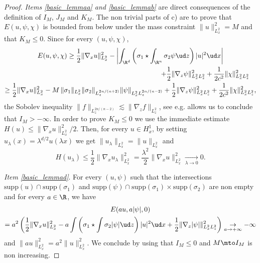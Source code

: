 \begin{proof}
\textit{Items \eqref{basic_lemmaa} and \eqref{basic_lemmab}} are direct consequences of the definition of $I_{M}$, $J_{M}$ and $K_{M}$. The non trivial parts of c) are to prove that $E(u,\psi,\chi)$ is bounded from below under the mass constraint $\|u\|_{L_{x}^{2}}^{2}=M$ and that $K_{M}\leq 0$. Since for every $(u,\psi,\chi)$,\vspace*{-5pt}
\bgroup
{}
\begin{multline}\label{gradient_borne}
E(u,\psi,\chi)\geq\frac{1}{2}\|\nabla_{x}u\|_{L_{x}^{2}}^{2}-\left|\int_{\R^{d}}\left(\sigma_{1}\star\int_{\R^{n}}\sigma_{2}\psi\ud z\right)|u|^{2}\ud x\right| \\
\shoveright{+\frac{1}{2}\|\nabla_{z}\psi\|_{L_{x}^{2}L_{z}^{2}}^{2}+\frac{1}{2c^{2}}\|\chi\|_{L_{x}^{2}L_{z}^{2}}^{2}}\\
\geq\frac{1}{2}\|\nabla_{x}u\|_{L_{x}^{2}}^{2}-M\,\|\sigma_{1}\|_{L_{x}^{2}}\|\sigma_{2}\|_{L_{z}^{2n/(n+2)}}\|\psi\|_{L_{x}^{2}L_{z}^{2n/(n-2)}}
+\frac{1}{2}\|\nabla_{z}\psi\|_{L_{x}^{2}L_{z}^{2}}^{2}+\frac{1}{2c^{2}}\|\chi\|_{L_{x}^{2}L_{z}^{2}}^{2},
\end{multline}
\egroup
the Sobolev inequality $\|f\|_{L_{z}^{2n/(n-2)}}\lesssim\|\nabla_{z}f\|_{L_{z}^{2}}$, see e.g. \cite[Th., p.\,125]{Nir} allows us to conclude that $I_{M}>-\infty$. In order to prove $K_{M}\leq 0$ we use the immediate estimate $H(u)\leq \|\nabla_{x}u\|_{L_{x}^{2}}^{2}/2$. Then, for every $u\in H_{x}^{1}$, by setting $u_{\lambda}(x)=\lambda^{d/2}u(\lambda x)$ we get $\|u_{\lambda}\|_{L_{x}^{2}}=\|u\|_{L_{x}^{2}}$ and
\[
H(u_{\lambda})\leq\frac{1}{2}\|\nabla_{x}u_{\lambda}\|_{L_{x}^{2}}^{2}=\frac{\lambda^{2}}{2}\|\nabla_{x}u\|_{L_{x}^{2}}^{2}\underset{\lambda\to 0}{\to}0.
\]

\textit{Item \eqref{basic_lemmad}}. For every $(u,\psi)$ such that the intersections $\mathrm{supp}(u)\cap\mathrm{supp}(\sigma_{1})$ and $\mathrm{supp}(\psi)\cap\mathrm{supp}(\sigma_{1})\times\mathrm{supp}(\sigma_{2})$ are non empty and for every $a\in\R$, we have
\begin{multline*}
E(au,a|\psi|,0)
\\
= a^{2}\left(\frac{1}{2}\|\nabla_{x}u\|_{L_{x}^{2}}^{2}-a\int\left(\sigma_{1}\star\int\sigma_{2}|\psi|\ud z\right)|u|^{2}\ud x+\frac{1}{2}\|\nabla_{z}|\psi|\|_{L_{x}^{2}L_{z}^{2}}^{2}\right)\underset{a\to+\infty}{\to}-\infty
\end{multline*}
and $\|au\|_{L_{x}^{2}}^{2}=a^{2}\|u\|_{L_{x}^{2}}^{2}$. We conclude by using that $I_{M}\leq 0$ and $M\mto I_{M}$ is non increasing.


\end{proof}
